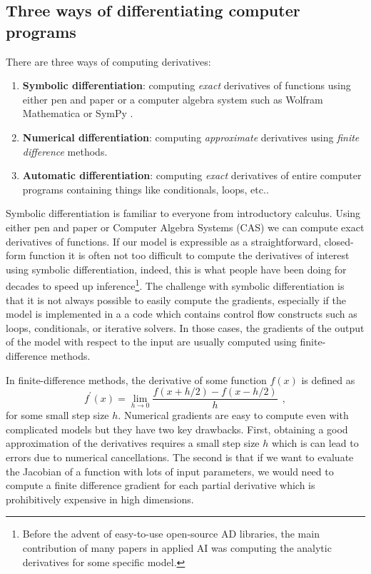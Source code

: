 \documentclass[12pt,dvipsnames]{report}
\newcommand{\ssf}[1]{\textsf{#1}}
\newcommand{\hquad}{~~}
\begin{document}
\subsection{Three ways of differentiating computer programs}
There are three ways of computing derivatives:
\begin{enumerate}
    \item \textbf{Symbolic differentiation}: computing \emph{exact} derivatives of 
    functions using either pen and paper or a computer algebra system such as 
    \ssf{Wolfram Mathematica} or \ssf{SymPy} \citep{10.7717/peerj-cs.103}.
    \item \textbf{Numerical differentiation}: computing \emph{approximate} derivatives 
    using \emph{finite difference}  methods.
    \item \textbf{Automatic differentiation}: computing \emph{exact} derivatives of entire 
    computer programs containing things like conditionals, loops, etc..
\end{enumerate}
Symbolic differentiation is familiar to everyone from introductory calculus. Using either 
pen and paper  or Computer Algebra Systems (CAS) we can compute exact 
derivatives of functions. 
If our model is expressible as a straightforward, closed-form function it is 
often not too difficult to compute the derivatives of interest using symbolic differentiation,
indeed, this is what people have been doing for decades to speed up 
inference\footnote{Before the advent of easy-to-use open-source AD libraries,
the main contribution of many papers in applied AI was computing the analytic 
derivatives for some specific model.}.
The challenge with symbolic differentiation is that it is not always possible 
to easily compute the gradients, especially if the model is implemented in a
a code which contains control flow constructs such as loops, conditionals, 
or iterative solvers. In those cases, the gradients of the output of the model 
with respect to the input are usually computed using finite-difference 
methods. 

In finite-difference methods, the derivative of some function $f(x)$
is defined as 
\begin{equation}
    f^\prime(x)=\lim _{h \rightarrow 0} \frac{f(x+h / 2)-f(x-h / 2)}{h}
    \hquad,
\end{equation}
for some small step size $h$. Numerical gradients are easy to compute even with 
complicated models but they have two key drawbacks. First, obtaining a 
good approximation of the derivatives requires a small step size $h$ which is 
can lead to errors due to numerical cancellations.
The second is that if we want to evaluate the Jacobian of a function with lots 
of input parameters, we would need to compute a finite difference gradient 
for each partial derivative which is prohibitively expensive in high dimensions.
\end{document}
